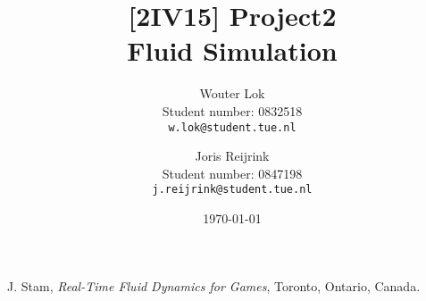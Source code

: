 \documentclass[a4paper,twoside,11pt]{article}
\title{\sffamily\bfseries
[2IV15] Project2 \\[1ex]
\large Fluid Simulation
}
\author{
    Wouter Lok \\
    Student number: 0832518 \\
    \texttt{w.lok@student.tue.nl}
    \and
    Joris Reijrink \\
    Student number: 0847198 \\
    \texttt{j.reijrink@student.tue.nl}\\
}
\date{\today}
\begin{document}
\maketitle
\newpage









\begin{thebibliography}{1}
    J. Stam,
    \emph{Real-Time Fluid Dynamics for Games},
    Toronto, Ontario, Canada.
\end{thebibliography}
    
\end{document}
